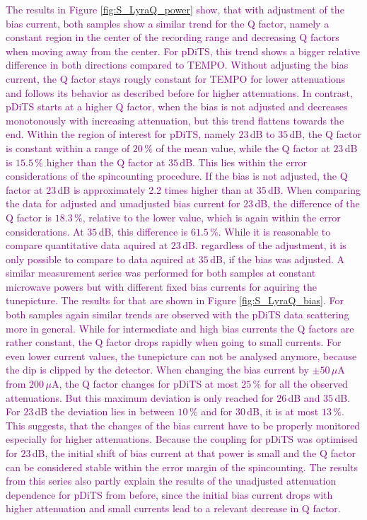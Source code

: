 \documentclass{WileyMSP-template}
\newcommand{\ds}[1]{\textcolor{purple}{#1}}
\begin{document}
\ds{
The results in Figure \ref{fig:S_LyraQ_power} show, that with adjustment of the bias current, both samples show a similar trend for the Q factor, namely a constant region in the center of the recording range and decreasing Q factors when moving away from the center. For pDiTS, this trend shows a bigger relative difference in both directions compared to TEMPO. Without adjusting the bias current, the Q factor stays rougly constant for TEMPO for lower attenuations and follows its behavior as described before for higher attenuations. In contrast, pDiTS starts at a higher Q factor, when the bias is not adjusted and decreases monotonously with increasing attenuation, but this trend flattens towards the end. Within the region of interest for pDiTS, namely $23\,$dB to $35\,$dB, the Q factor is constant within a range of $20\,\%$ of the mean value, while the Q factor at $23\,$dB is $15.5\,\%$ higher than the Q factor at $35\,$dB. This lies within the error considerations of the spincounting procedure. If the bias is not adjusted, the Q factor at $23\,$dB is approximately 2.2 times higher than at $35\,$dB. When comparing the data for adjusted and umadjusted bias current for $23\,$dB, the difference of the Q factor is $18.3\,\%$, relative to the lower value, which is again within the error considerations. At $35\,$dB, this difference is $61.5\,\%$. While it is reasonable to compare quantitative data aquired at $23\,$dB. regardless of the adjustment, it is only possible to compare to data aquired at $35\,$dB, if the bias was adjusted.}
\bigbreak
\ds{A similar measurement series was performed for both samples at constant microwave powers but with different fixed bias currents for aquiring the tunepicture. The results for that are shown in Figure \ref{fig:S_LyraQ_bias}. For both samples again similar trends are observed with the pDiTS data scattering more in general. While for intermediate and high bias currents the Q factors are rather constant, the Q factor drops rapidly when going to small currents. For even lower current values, the tunepicture can not be analysed anymore, because the dip is clipped by the detector. When changing the bias current by $\pm 50\,\mu$A from $200\,\mu$A, the Q factor changes for pDiTS at most $25\,\%$ for all the observed attenuations. But this maximum deviation is only reached for $26\,$dB and $35\,$dB. For $23\,$dB the deviation lies in between $10\,\%$ and for $30\,$dB, it is at most $13\,\%$. This suggests, that the changes of the bias current have to be properly monitored especially for higher attenuations. Because the coupling for pDiTS was optimised for $23\,$dB, the initial shift of bias current at that power is small and the Q factor can be considered stable within the error margin of the spincounting. The results from this series also partly explain the results of the unadjusted attenuation dependence for pDiTS from before, since the initial bias current drops with higher attenuation and small currents lead to a relevant decrease in Q factor.}
\end{document}
